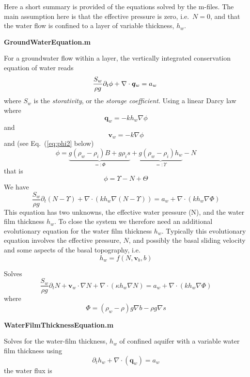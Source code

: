 \documentclass[10pt,a4paper]{article}
\begin{document}
Here a short summary is
provided of the equations solved by the m-files. The main assumption
here is that the effective pressure is zero, i.e.\ $N=0$, and that the
water flow is confined to a layer of variable thickness, $h_w$.

\bigskip
\textbf{GroundWaterEquation.m}

For a groundwater flow within a layer, the vertically
integrated conservation equation of water reads
\begin{equation}
  \frac{S_w}{\rho g} \partial_t \phi + \nabla \cdot \bm{q}_w  = a_w \; 
\label{eq:hydphi}
\end{equation}
where $S_w$ is the \emph{storativity}, or the \emph{storage coefficient}. Using a linear Darcy law where
\[
\bm{q}_w = -k h_w \nabla \phi
\]
and 
\[
\bm{v}_w= - k \nabla \phi
\]
and (see Eq.~(\ref{eq:phi2} below) 
\[
  \phi = \underbrace{g (\rho_w-\rho_i) B + g \rho_i s}_{=:\Phi} +  \underbrace{g (\rho_w-\rho_i)  h_w}_{=:\Upsilon}  - N 
  \]
  that is
\[
\phi=\Upsilon - N +\Theta
\]
We have
\[
\frac{S_w}{\rho g}  \partial_t (N-\Upsilon)  + \nabla \cdot (k h_w \nabla (N-\Upsilon)) = a_w + \nabla \cdot (k h_w \nabla \Phi )
\]
This equation has two unknowns, the effective water pressure (N), and
the water film thickness $h_w$. To close the system we therefore need
an additional evolutionary equation for the water film thickness
$h_w$. Typically this evolutionary equation involves the effective
pressure, $N$, and possibly the basal sliding velocity and some aspects of the basal topography, i.e.\
\[
h_w=f(N,\bm{v}_b,b)
\]



Solves
\[
\frac{S_w}{\rho g}  \partial_t N +  \bm{v}_w \cdot \nabla N  + \nabla \cdot (\kappa h_w \nabla N) = a_w + \nabla \cdot (k h_w \nabla \Phi )
\]
where
\[
\Phi = (\rho_w-\rho) g \nabla b - \rho g \nabla s
\]




\medskip
\textbf{WaterFilmThicknessEquation.m }

Solves for the water-film thickness, $h_w$ of confined aquifer with a
variable water film thickness using
\[\partial_t h_w +   \nabla \cdot ( \bm{q}_w ) = a_w \]
the water flux is
\end{document}
